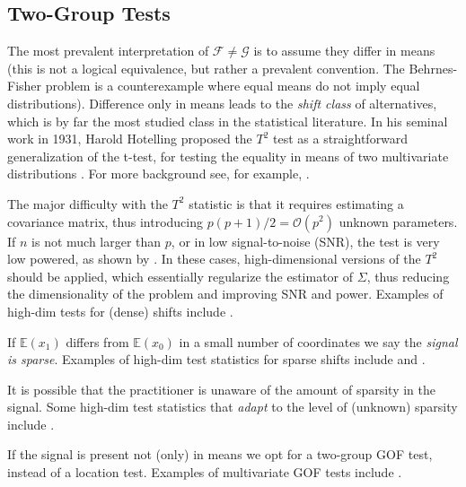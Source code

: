 \documentclass[]{bio}
\begin{document}
\subsection{Two-Group Tests}
The most prevalent interpretation of $\mathcal{F}\neq \mathcal{G}$ is to assume they differ in means (this is not a logical equivalence, but rather a prevalent convention. The Behrnes-Fisher problem is a counterexample where equal means do not imply equal distributions). 
Difference only in means leads to the \emph{shift class} of alternatives, which is by far the most studied class in the statistical literature. 
In his seminal work in 1931, Harold Hotelling proposed the $T^2$ test as a straightforward generalization of the t-test, for testing the equality in means of two multivariate distributions \citep{hotelling_generalization_1931}. 
For more background see, for example, \cite{anderson_introduction_2003}.

The major difficulty with the $T^2$ statistic is that it requires estimating a covariance matrix, thus introducing $p(p+1)/2=\mathcal{O}(p^2)$ unknown parameters.
If $n$ is not much larger than $p$, or in low signal-to-noise (SNR), the test is very low powered, as shown by \cite{bai1996effect}. 
In these cases, high-dimensional versions of the $T^2$ should be applied, which essentially regularize the estimator of $\Sigma$, thus reducing the dimensionality of the problem and improving SNR and power.
Examples of high-dim tests for (dense) shifts include 
\cite{dempster1958high,bai1996effect,schafer_shrinkage_2005,goeman2006testing,srivastava_test_2008,chen_two-sample_2010,lopes2011more,ahmad2014u,thulin2014high,feng2015note}.

If $\mathbb{E}(x_1)$ differs from $\mathbb{E}(x_0)$ in a small number of coordinates we say the \emph{signal is sparse}.
Examples of high-dim test statistics for sparse shifts include \cite{cai_two-sample_2013} and \cite{chang2014simulation}.

It is possible that the practitioner is unaware of the amount of sparsity in the signal. 
Some high-dim test statistics that \emph{adapt} to the level of (unknown) sparsity include \cite{simes1986improved,donoho2004higher,zhong2013tests,shen2015adaptive,moscovich2016exact}.

If the signal is present not (only) in means we opt for a two-group GOF test, instead of a location test. 
Examples of multivariate GOF tests include \cite{bickel1969distribution,friedman1979multivariate,hall2002permutation,szekely2004testing,Biau2005,Rosenbaum2005,eric2008testing,perez2009estimation,vayatis_auc_2009,gretton_kernel_2012-1}.
\end{document}
